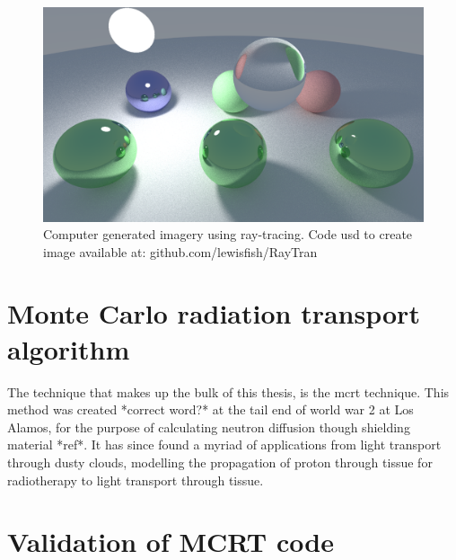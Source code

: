 \begin{figure}
\centering
\includegraphics[width=\columnwidth]{./MCRT/images/ray-tracing.png}
\caption{Computer generated imagery using ray-tracing. Code usd to create image available at: github.com/lewisfish/RayTran}
\label{fig:ray-trace}
\end{figure}

\section{Monte Carlo radiation transport algorithm}

The technique that makes up the bulk of this thesis, is the \gls{mcrt} technique. This method was created *correct word?* at the tail end of world war 2 at Los Alamos, for the purpose of calculating neutron diffusion though shielding material *ref*. It has since found a myriad of applications from light transport through dusty clouds, modelling the propagation of proton through tissue for radiotherapy to light transport through tissue.

\section{Validation of MCRT code}
